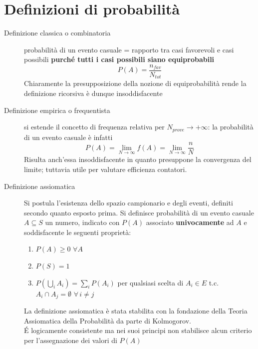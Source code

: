 \documentclass[10pt, oneside]{book}
\newcommand{\limit}[2]{\lim\limits_{#1 \rightarrow #2}}
\begin{document}
\section{Definizioni di probabilità}
\begin{description}
\item[Definizione classica o combinatoria] probabilità di un evento casuale = rapporto tra casi favorevoli e casi possibili \textbf{purché tutti i casi possibili siano equiprobabili}
\[P(A) = \frac{n_{fav}}{N_{tot}}\]
Chiaramente la presupposizione della nozione di equiprobabilità rende la definizione ricorsiva è dunque insoddisfacente
\item[Definizione empirica o frequentista] si estende il concetto di frequenza relativa per $\displaystyle N_{prove} \rightarrow +\infty$: la probabilità di un evento casuale è infatti
\[P(A) = \limit{N}{\infty} f(A) = \limit{N}{\infty} \frac{n}{N}\]
Risulta anch'essa insoddisfacente in quanto presuppone la convergenza del limite; tuttavia utile per valutare efficienza contatori.
\item[Definizione assiomatica] Si postula l'esistenza dello spazio campionario e degli eventi, definiti secondo quanto esposto prima. Si definisce probabilità di un evento casuale $A \subseteq S$ un numero, indicato con $P(A)$ associato \textbf{univocamente} ad $A$ e soddisfacente le seguenti proprietà:
\begin{enumerate}
\item $P(A) \geq 0$ $\forall A$
\item $P(S) = 1$
\item $\displaystyle P(\bigcup_i A_i) = \sum_i P(A_i)$ per qualsiasi scelta di $A_i \in E$ t.c. $A_i \cap A_j = \emptyset$ $\forall \, i \neq j$
\end{enumerate}
La definizione assiomatica è stata stabilita con la fondazione della Teoria Assiomatica della Probabilità da parte di Kolmogorov.\\
\'E logicamente consistente ma nei suoi principi non stabilisce alcun criterio per l'assegnazione dei valori di $P(A)$
\end{description}
\end{document}
